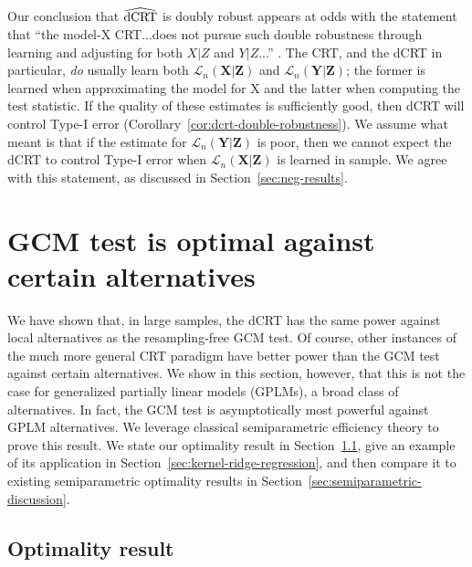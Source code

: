 \documentclass[12pt]{article}
\theoremstyle{definition}
\theoremstyle{remark}
\newcommand{\prx}{\bm X}								%
\newcommand{\prz}{\bm Z}								%
\newcommand{\pry}{{\bm Y}}								%
\newcommand{\law}{\mathcal L}							%
\newcommand{\dCRThat}{\widehat{\textnormal{dCRT}}}		%
\begin{document}
	Our conclusion that $\dCRThat$ is doubly robust appears at odds with the statement that ``the model-X CRT...does not pursue such double robustness through learning and adjusting for both $X|Z$ and $Y|Z$...'' \citep{Li2022}. The CRT, and the dCRT in particular, \textit{do} usually learn both $\law_n(\prx|\prz)$ and $\law_n(\pry|\prz)$; the former is learned when approximating the model for X and the latter when computing the test statistic. If the quality of these estimates is sufficiently good, then dCRT will control Type-I error (Corollary~\ref{cor:dcrt-double-robustness}). We assume what \citet{Li2022} meant is that if the estimate for $\law_n(\pry|\prz)$ is poor, then we cannot expect the dCRT to control Type-I error when $\law_n(\prx|\prz)$ is learned in sample. We agree with this statement, as discussed in Section~\ref{sec:neg-results}. 
	
	
	\section{GCM test is optimal against certain alternatives} \label{sec:optimality}
	
	We have shown that, in large samples, the dCRT has the same power against local alternatives as the resampling-free GCM test. Of course, other instances of the much more general CRT paradigm have better power than the GCM test against certain alternatives. We show in this section, however, that this is not the case for generalized partially linear models (GPLMs), a broad class of alternatives. In fact, the GCM test is asymptotically most powerful against GPLM alternatives. We leverage classical semiparametric efficiency theory \citep{Choi1996, VDV1998, Kosorok2008} to prove this result. We state our optimality result in Section~\ref{sec:optimality-result}, give an example of its application in Section~\ref{sec:kernel-ridge-regression}, and then compare it to existing semiparametric optimality results in Section~\ref{sec:semiparametric-discussion}.
	
	\subsection{Optimality result} \label{sec:optimality-result}
	
\end{document}
